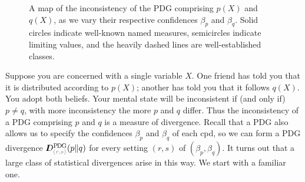 \begin{figure}
{
    }%
	\caption[%
        Statistical distances as inconsistencies: a map of the inconsistency of $p(X)$ and $q(X)$, as their respective confidences vary.]
    {A map of the inconsistency of the PDG comprising $p(X)$ and $q(X)$, as we vary their respective confidences $\beta_p$ and $\beta_q$. Solid circles indicate well-known named measures, semicircles indicate limiting values, and the heavily dashed lines are well-established classes. }
	\label{fig:statdistmap}
\end{figure}

Suppose you are concerned with a single variable $X$. One friend has told you that it is distributed according to $p(X)$; another has told you that it follows $q(X)$. You adopt both beliefs. Your mental state will be inconsistent if (and only if) $p \ne q$, with more inconsistency the more $p$ and $q$ differ.
Thus the inconsistency of a PDG comprising $p$ and $q$ is a measure of divergence.
Recall that a PDG also allows us to specify the confidences $\beta_p$
and $\beta_q$ of each cpd, so we can form a PDG divergence
$\thickD^{\mathrm{P\mskip-2muD\mskip-1.5muG}}_{{\color{gray}(r,s)}}(p\Vert q)$
for every setting $(r,s)$ of $(\beta_p, \beta_q)$.
It turns out that a large class of statistical divergences arise in this way.
We start with a familiar one.

